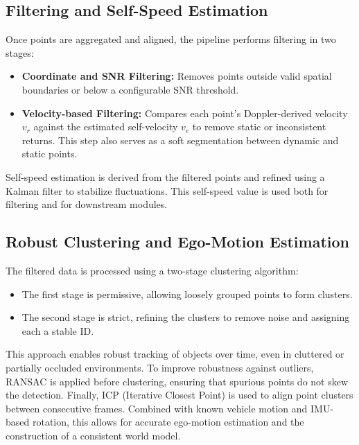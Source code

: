\subsection*{Filtering and Self-Speed Estimation}
Once points are aggregated and aligned, the pipeline performs filtering in two stages:

\begin{itemize}
    \item \textbf{Coordinate and SNR Filtering:} Removes points outside valid spatial boundaries or below a configurable SNR threshold.
    \item \textbf{Velocity-based Filtering:} Compares each point's Doppler-derived velocity $v_r$ against the estimated self-velocity $v_e$ to remove static or inconsistent returns. This step also serves as a soft segmentation between dynamic and static points.
\end{itemize}

Self-speed estimation is derived from the filtered points and refined using a Kalman filter to stabilize fluctuations. This self-speed value is used both for filtering and for downstream modules.

\subsection*{Robust Clustering and Ego-Motion Estimation}
The filtered data is processed using a two-stage clustering algorithm:

\begin{itemize}
    \item The first stage is permissive, allowing loosely grouped points to form clusters.
    \item The second stage is strict, refining the clusters to remove noise and assigning each a stable ID.
\end{itemize}

This approach enables robust tracking of objects over time, even in cluttered or partially occluded environments.
To improve robustness against outliers, RANSAC is applied before clustering, ensuring that spurious points do not skew the detection.
Finally, ICP (Iterative Closest Point) is used to align point clusters between consecutive frames. 
Combined with known vehicle motion and IMU-based rotation, this allows for accurate ego-motion estimation and the construction of a consistent world model.


